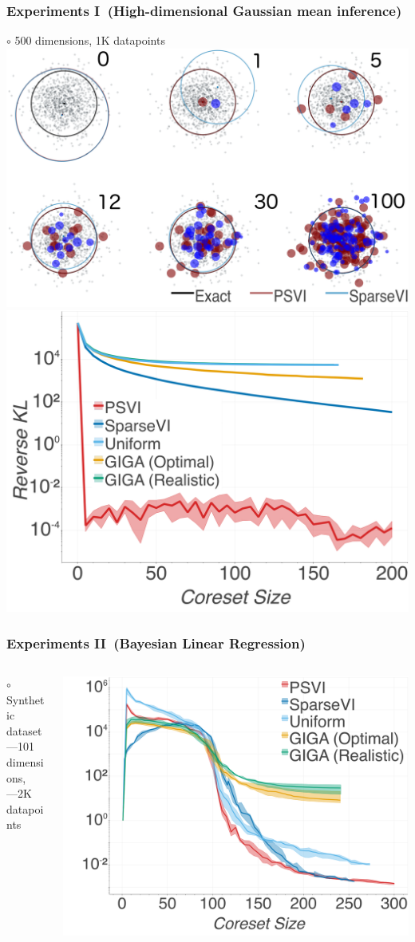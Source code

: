 \documentclass[hyperref={colorlinks = true},unknownkeysallowed]{beamer}
\begin{document}
\begin{frame}
	\frametitle{Experiments I~(High-dimensional Gaussian mean inference)}
	\centering 
	$\circ$ 500 dimensions, 1K datapoints\\
	\includegraphics[width=.49\textwidth]{figs/d500_pts_combined.png}
	\includegraphics[width=.49\textwidth]{figs/d500_KLDvsCstSize.png}
\end{frame}

\begin{frame}
	\frametitle{Experiments II~(Bayesian Linear Regression)}
	\centering
	\begin{columns}
		\begin{column}{.5\textwidth}
		$\circ$ Synthetic dataset
		\\---101 dimensions,
		\\---2K datapoints
		\end{column}
		\begin{column}{.5\textwidth}
		\includegraphics[width=1.\textwidth]{figs/linregKLDvsCstSize.png}
		\end{column}
	\end{columns}
\end{frame}
\end{document}
